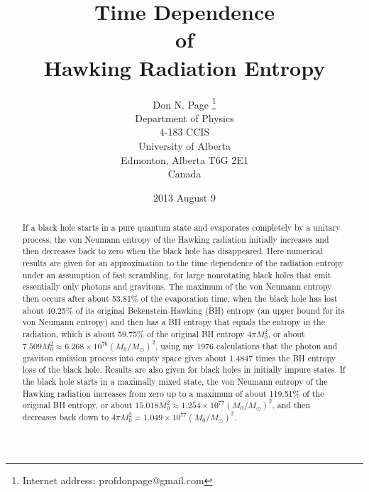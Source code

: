 \documentclass[12pt]{article}
\begin{document}
\title{{\bf Time Dependence\\ of\\ Hawking Radiation Entropy}}

\author{
Don N. Page
\thanks{Internet address:
profdonpage@gmail.com}
\\
Department of Physics\\
4-183 CCIS\\
University of Alberta\\
Edmonton, Alberta T6G 2E1\\
Canada
}

\date{2013 August 9}

\maketitle
\begin{abstract}

If a black hole starts in a pure quantum state and evaporates completely by a unitary process, the von Neumann entropy of the Hawking radiation initially increases and then decreases back to zero when the black hole has disappeared.  Here numerical results are given for an approximation to the time dependence of the radiation entropy under an assumption of fast scrambling, for large nonrotating black holes that emit essentially only photons and gravitons.  The maximum of the von Neumann entropy then occurs after about 53.81\% of the evaporation time, when the black hole has lost about 40.25\% of its original Bekenstein-Hawking (BH) entropy (an upper bound for its von Neumann entropy) and then has a BH entropy that equals the entropy in the radiation, which is about 59.75\% of the original BH entropy $4\pi M_0^2$, or about $7.509 M_0^2 \approx 6.268\times 10^{76}(M_0/M_\odot)^2$, using my 1976 calculations that the photon and graviton emission process into empty space gives about 1.4847 times the BH entropy loss of the black hole. Results are also given for black holes in initially impure states.  If the black hole starts in a maximally mixed state, the von Neumann entropy of the Hawking radiation increases from zero up to a maximum of about 119.51\% of the original BH entropy, or about $15.018 M_0^2 \approx 1.254\times 10^{77}(M_0/M_\odot)^2$, and then decreases back down to $4\pi M_0^2 = 1.049\times 10^{77}(M_0/M_\odot)^2$.

\end{abstract}

\normalsize
\newpage
\end{document}
